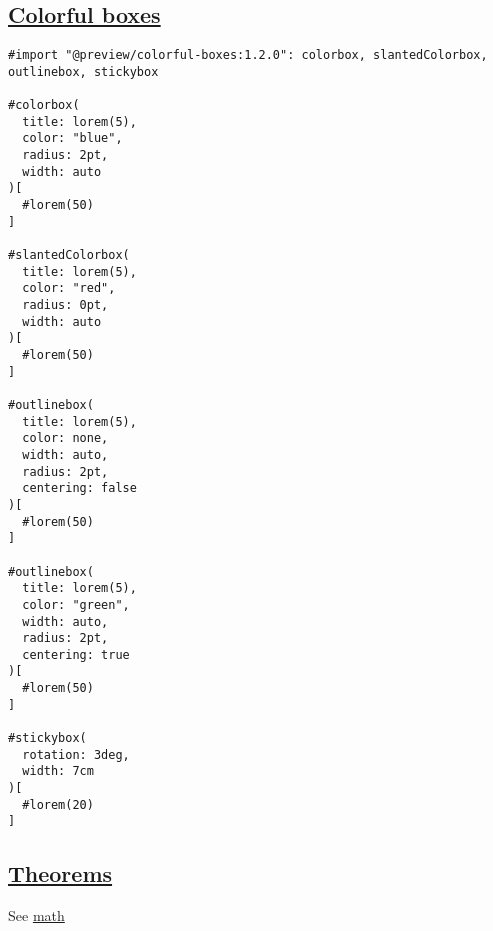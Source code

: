 \pandocbounded{}

\subsection{\texorpdfstring{\hyperref[colorful-boxes]{Colorful
boxes}}{Colorful boxes}}\label{colorful-boxes}

\begin{verbatim}
#import "@preview/colorful-boxes:1.2.0": colorbox, slantedColorbox, outlinebox, stickybox

#colorbox(
  title: lorem(5),
  color: "blue",
  radius: 2pt,
  width: auto
)[
  #lorem(50)
]

#slantedColorbox(
  title: lorem(5),
  color: "red",
  radius: 0pt,
  width: auto
)[
  #lorem(50)
]

#outlinebox(
  title: lorem(5),
  color: none,
  width: auto,
  radius: 2pt,
  centering: false
)[
  #lorem(50)
]

#outlinebox(
  title: lorem(5),
  color: "green",
  width: auto,
  radius: 2pt,
  centering: true
)[
  #lorem(50)
]

#stickybox(
  rotation: 3deg,
  width: 7cm
)[
  #lorem(20)
]
\end{verbatim}

\pandocbounded{}

\subsection{\texorpdfstring{\hyperref[theorems]{Theorems}}{Theorems}}\label{theorems}

See \href{./math.html}{math}
